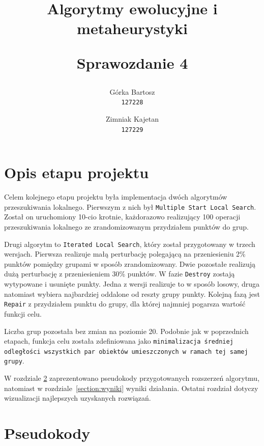 \documentclass[main.tex]{subfiles}
\begin{document}
\title{
    \textbf{Algorytmy ewolucyjne i metaheurystyki}\\
    \begin{large}
        Sprawozdanie 4
    \end{large}
}

\author{
    Górka Bartosz\\
  \texttt{127228}
  \and
  Zimniak Kajetan\\
  \texttt{127229}
}

\date{}

\maketitle

\section{Opis etapu projektu}
Celem kolejnego etapu projektu była implementacja dwóch algorytmów przeszukiwania lokalnego. Pierwszym z nich był \texttt{Multiple Start Local Search}. Został on uruchomiony 10-cio krotnie, każdorazowo realizujący 100 operacji przeszukiwania lokalnego ze zrandomizowanym przydziałem punktów do grup.

Drugi algorytm to \texttt{Iterated Local Search}, który został przygotowany w trzech wersjach. Pierwsza realizuje małą perturbację polegającą na przeniesieniu 2\% punktów pomiędzy grupami w sposób zrandomizowany. Dwie pozostałe realizują dużą perturbację z przeniesieniem 30\% punktów. W fazie \texttt{Destroy} zostają wytypowane i usunięte punkty. Jedna z wersji realizuje to w sposób losowy, druga natomiast wybiera najbardziej oddalone od reszty grupy punkty. Kolejną fazą jest \texttt{Repair} z przydziałem punktu do grupy, dla której najmniej pogarsza wartość funkcji celu.

Liczba grup pozostała bez zmian na poziomie 20. Podobnie jak w poprzednich etapach, funkcja celu została zdefiniowana jako \texttt{minimalizacja średniej odległości wszystkich par obiektów umieszczonych w ramach tej samej grupy}.

W rozdziale \ref{section:pseudokody} zaprezentowano pseudokody przygotowanych rozszerzeń algorytmu, natomiast w rozdziale\leavevmode\nobreak\ \ref{section:wyniki} wyniki działania. Ostatni rozdział dotyczy wizualizacji najlepszych uzyskanych rozwiązań.

\section{Pseudokody}
\label{section:pseudokody}
\end{document}
